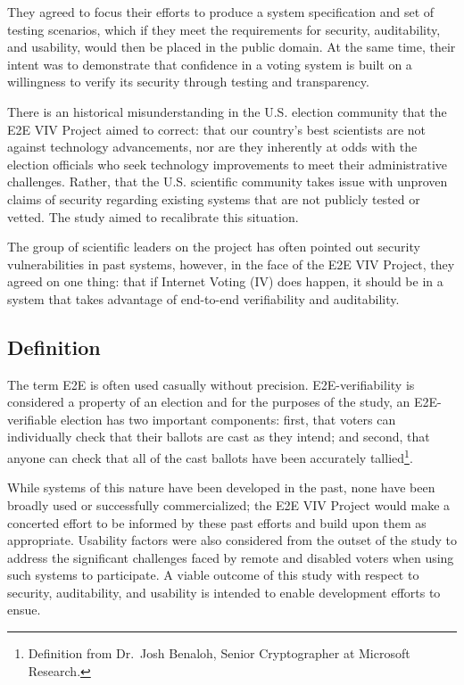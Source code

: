 They agreed to focus their efforts to produce a system specification
and set of testing scenarios, which if they meet the requirements for
security, auditability, and usability, would then be placed in the
public domain. At the same time, their intent was to demonstrate that
confidence in a voting system is built on a willingness to verify its
security through testing and transparency. 

There is an historical misunderstanding in the U.S. election community
that the E2E VIV Project aimed to correct: that our country’s best
scientists are not against technology advancements, nor are they
inherently at odds with the election officials who seek technology
improvements to meet their administrative challenges. Rather, that the
U.S. scientific community takes issue with unproven claims of security
regarding existing systems that are not publicly tested or vetted. The
study aimed to recalibrate this situation. 

The group of scientific leaders on the project has often pointed out
security vulnerabilities in past systems, however, in the face of the
E2E VIV Project, they agreed on one thing: that if Internet Voting
(IV) does happen, it should be in a system that takes advantage of
end-to-end verifiability and auditability.

\subsection{Definition}
\label{sec:definition}

The term E2E is often used casually without
precision. E2E-verifiability is considered a property of an election
and for the purposes of the study, an E2E-verifiable election has two
important components: first, that voters can individually check that
their ballots are cast as they intend; and second, that anyone can
check that all of the cast ballots have been accurately
tallied\footnote{Definition from Dr.~Josh Benaloh, Senior
  Cryptographer at Microsoft Research.}.

While systems of this nature have been developed in the past, none
have been broadly used or successfully commercialized; the E2E VIV
Project would make a concerted effort to be informed by these past
efforts and build upon them as appropriate. Usability factors were
also considered from the outset of the study to address the
significant challenges faced by remote and disabled voters when using
such systems to participate. A viable outcome of this study with
respect to security, auditability, and usability is intended to enable
development efforts to ensue.

